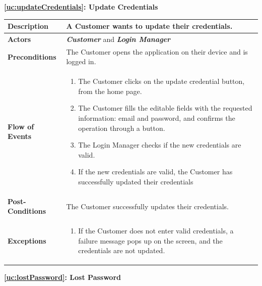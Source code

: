 \documentclass[a4paper, 12pt, oneside]{article}
\begin{document}
\begin{center}
{\textbf{\ref{uc:updateCredentials}: Update Credentials}}
\end{center}
\begin{tabularx}{\linewidth}{| l | X |}
	
	\hline
	\textbf{Description} & A Customer wants to update their credentials.\\
	

	\hline
	\textbf{Actors} & \textbf{\textit{Customer}} and \textit{\textbf{Login Manager}}\\
	
	\hline
	\textbf{Preconditions} & The Customer opens the application on their device and is logged in.\\
	
	\hline
	\textbf{Flow of Events} & \parbox{0.7\textwidth}{	
		\begin{enumerate}
			\item The Customer clicks on the update credential button, from the home page.
			\item The Customer fills the editable fields with the requested information: email and password, and confirms the operation through a button.
			\item The Login Manager checks if the new credentials are valid. 
			\item If the new credentials are valid, the Customer has successfully updated their credentials
	\end{enumerate}}\\
	
	\hline
	\textbf{Post-Conditions} & The Customer successfully updates their credentials.\\
	
	\hline
	\textbf{Exceptions} & \parbox{0.7\textwidth}{ \begin{enumerate}
			\item If the Customer does not enter valid credentials, a failure message pops up on the screen, and the credentials are not updated.
		\end{enumerate}}\\

	\hline
	
\end{tabularx}
\newpage
\begin{center}
{\textbf{\ref{uc:lostPassword}: Lost Password}}
\end{center}
\end{document}
